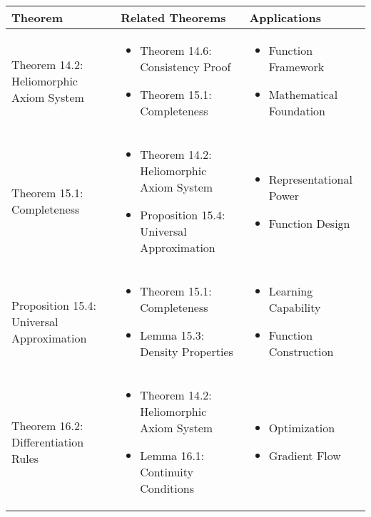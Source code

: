\begin{table}[h]
\centering
\begin{tabular}{|l|p{7cm}|p{4cm}|}
\hline
\textbf{Theorem} & \textbf{Related Theorems} & \textbf{Applications} \\
\hline
Theorem 14.2: Heliomorphic Axiom System &
\begin{itemize}
    \item Theorem 14.6: Consistency Proof
    \item Theorem 15.1: Completeness
\end{itemize} &
\begin{itemize}
    \item Function Framework
    \item Mathematical Foundation
\end{itemize} \\
\hline
Theorem 15.1: Completeness &
\begin{itemize}
    \item Theorem 14.2: Heliomorphic Axiom System
    \item Proposition 15.4: Universal Approximation
\end{itemize} &
\begin{itemize}
    \item Representational Power
    \item Function Design
\end{itemize} \\
\hline
Proposition 15.4: Universal Approximation &
\begin{itemize}
    \item Theorem 15.1: Completeness
    \item Lemma 15.3: Density Properties
\end{itemize} &
\begin{itemize}
    \item Learning Capability
    \item Function Construction
\end{itemize} \\
\hline
Theorem 16.2: Differentiation Rules &
\begin{itemize}
    \item Theorem 14.2: Heliomorphic Axiom System
    \item Lemma 16.1: Continuity Conditions
\end{itemize} &
\begin{itemize}
    \item Optimization
    \item Gradient Flow

\end{itemize}
\end{tabular}
\end{table}
